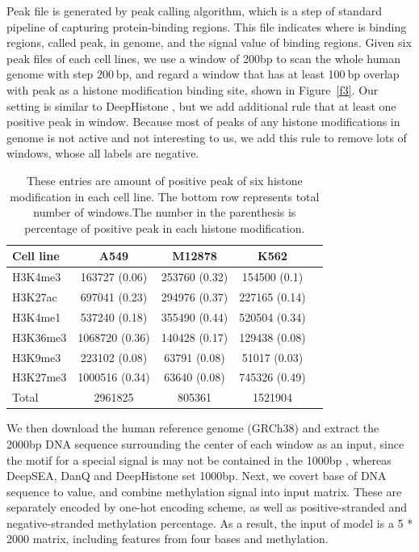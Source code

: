 Peak file is generated by peak calling algorithm, which is a step of standard pipeline of capturing protein-binding regions. This file indicates where is binding regions, called peak, in genome, and the signal value of binding regions. Given six peak files of each cell lines, we use a window of 200bp to scan the whole human genome with step 200 bp, and regard a window that has at least 100 bp overlap with peak as a histone modification binding site, shown in Figure~\ref{f3}. Our setting is similar to DeepHistone \cite{yin2019deephistone}, but we add additional rule that at least one positive peak in window. Because most of peaks of any histone modifications in genome is not active and not interesting to us, we add this rule to remove lots of windows, whose all labels are negative.

\begin{table}[H]%
    \centering
    \begin{tabular}{lcccc}
    \hline
        Cell line & A549 & M12878 & K562	 \\\hline
        H3K4me3 & 163727 (0.06) & 253760 (0.32) & 154500 (0.1) \\
        H3K27ac & 697041 (0.23) & 294976 (0.37) & 227165 (0.14) \\
        H3K4me1 & 537240 (0.18) & 355490 (0.44) & 520504 (0.34) \\
        H3K36me3 & 1068720 (0.36) & 140428 (0.17) & 129438 (0.08) \\
        H3K9me3 & 223102 (0.08) & 63791 (0.08) & 51017 (0.03) \\
        H3K27me3 & 1000516 (0.34) & 63640 (0.08) & 745326 (0.49) \\\hline
        Total & 2961825 & 805361 & 1521904\\\hline
    \end{tabular}
    \captionsetup{labelfont=bf}
    \renewcommand{\baselinestretch}{1.0}
    \caption[Amount of windows of each cell line]{These entries are amount of positive peak of six histone modification in each cell line. The bottom row represents total number of windows.The number in the parenthesis is percentage of positive peak in each histone modification.}
    \label{t3}
\end{table}

We then download the human reference genome (GRCh38) and extract the 2000bp DNA sequence surrounding the center of each window as an input, since the motif for a special signal is may not be contained in the 1000bp \cite{lanchantin2020graph}, whereas DeepSEA, DanQ and DeepHistone set 1000bp. Next, we covert base of DNA sequence to value, and combine methylation signal into input matrix. These are separately encoded by one-hot encoding scheme, as well as positive-stranded and negative-stranded methylation percentage. As a result, the input of model is a 5 * 2000 matrix, including features from four bases and methylation.

